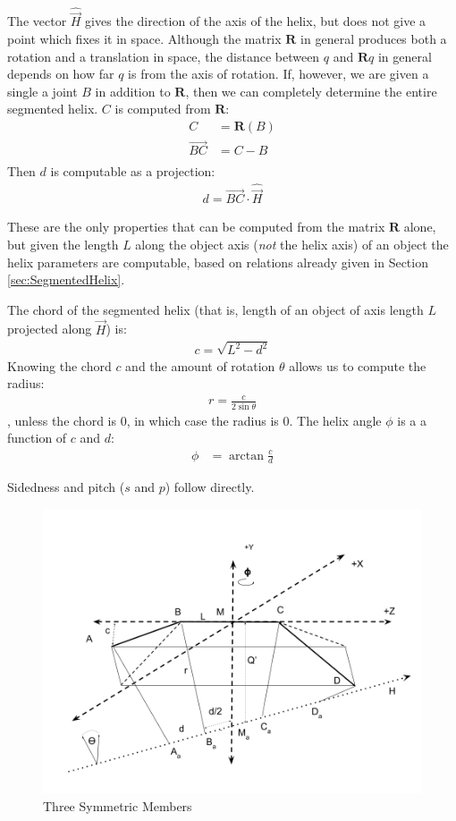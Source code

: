 \documentclass[mathematics,article,submit,pdftex,moreauthors]{Definitions/mdpi}
\begin{document}
The vector $\hat{\overrightarrow{H}}$ gives the direction of the
axis of the helix, but does not give a point which fixes
it in space.
Although the matrix $\bm{R}$ in general produces both a rotation
and a translation in space, the distance between $q$ and $\bm{R}q$
in general depends on how far $q$ is from the axis of rotation.
If, however, we are given a single a joint $B$ in addition to
$\bm{R}$, then we can completely determine the entire segmented helix.
$C$ is computed from $\bm{R}$:
\begin{align}
  C &= \bm{R}(B) \\
 \overrightarrow{BC} &= C - B\\
\end{align}
Then $d$ is computable as a projection:
\begin{align}
  d = \overrightarrow{BC} \cdot \hat{\overrightarrow{H}}
\end{align}

These are the only properties that can be computed from the
matrix $\bm{R}$ alone, but given the length $L$ along the
object axis ({\em not} the helix axis) of an object
the helix parameters are computable, based on relations
already given in Section \ref{sec:SegmentedHelix}.

The chord of the segmented helix (that is, length of an object of
axis length $L$
projected along $\overrightarrow{H}$) is:
\begin{align}
  c = \sqrt{L^2 - d^2}
\end{align}
Knowing the chord $c$ and the amount of rotation $\theta$
allows us to compute the radius:
\begin{align}
  r = \frac{c}{2 \sin{\theta}}
\end{align},
unless the chord is $0$, in which case the radius is $0$.
The helix angle $\phi$ is a a function of $c$ and $d$:
\begin{align}
    \phi &= \arctan{\frac{c}{d}}
\end{align}

Sidedness and pitch ($s$ and $p$) follow directly.


\begin{figure}
  \centering
  \captionsetup{justification=centering}
     \includegraphics[width=10 cm]{figures/ThreeMemberDiagram.png}
     \caption{Three Symmetric Members}
  \label{fig:threemembersdiagram}
\end{figure}
\unskip
\end{document}
